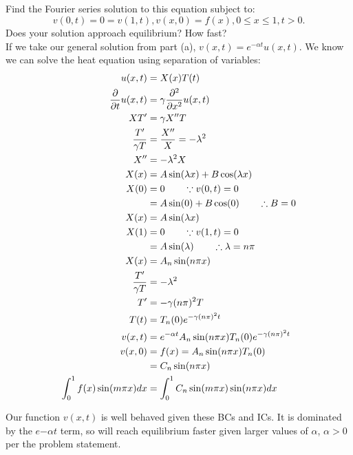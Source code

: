 \documentclass[12pt,USLetter]{article}
\begin{document}
\subsection{}

Find the Fourier series solution to this equation subject to:
\begin{equation*}
v(0,t) = 0 = v(1,t), v(x,0) = f(x), 0 \le x \le 1, t > 0.
\end{equation*}
Does your solution approach equilibrium? How fast? \\

If we take our general solution from part (a), $v(x,t) = e^{-\alpha t} u(x,t)$. We know we can solve the heat equation using separation of variables:
\begin{align*}
u(x,t) &= X(x)T(t) \\
\frac{\partial}{\partial{t}}u(x,t) &= \gamma \frac{\partial^2}{\partial{x}^2}u(x,t) \\
XT^{\prime} &= \gamma X^{\prime\prime} T \\
\frac{T^{\prime}}{\gamma T} &= \frac{X^{\prime\prime}}{X} = -\lambda^2 \\
X^{\prime\prime} &= -\lambda^2 X \\
X(x) &= A \sin(\lambda x) + B \cos(\lambda x) \\
X(0) &= 0 \qquad \because v(0,t) = 0 \\
&= A \sin(0) + B \cos(0) \qquad \therefore B = 0 \\
X(x) &= A\sin(\lambda x) \\
X(1) &= 0 \qquad \because v(1,t) = 0 \\
&= A\sin(\lambda) \qquad \therefore \lambda = n\pi \\
X(x) &= A_n\sin(n\pi x) \\
\frac{T^{\prime}}{\gamma T} &= -\lambda^2 \\
T^{\prime} &= - \gamma (n\pi)^2 T \\
T(t) &= T_n(0)e^{-\gamma (n\pi)^2 t} \\
v(x,t) &= e^{-\alpha t} A_n\sin(n\pi x) T_n(0)e^{-\gamma(n\pi)^2 t} \\
v(x,0) &= f(x) = A_n\sin(n\pi x) T_n(0) \\
&= C_n\sin(n\pi x) \\
\int_0^1 f(x)\sin(m\pi x) dx &= \int_0^1 C_n \sin(m\pi x)\sin(n\pi x) dx \\
\end{align*}

Our function $v(x,t)$ is well behaved given these BCs and ICs. It is dominated by the $e{-\alpha t}$ term, so will reach equilibrium faster given larger values of $\alpha$, $ \alpha > 0$ per the problem statement.
\end{document}
